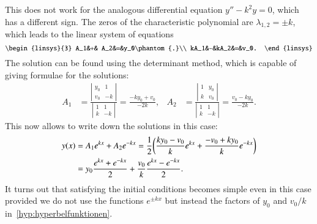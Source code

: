 This does not work for the analogous differential equation
$y''-k^2y=0$, which has a different sign.
The zeros of the characteristic polynomial are $\lambda_{1,2}=\pm k$,
which leads to the linear system of equations
\[
\begin{linsys}{3}
 A_1&+& A_2&=&y_0\phantom{.}\\
kA_1&-&kA_2&=&v_0.
\end{linsys}
\]
The solution can be found using the determinant method, which is
capable of giving formulae for the solutions:
\begin{align*}
A_1
&=
\frac{\left|\begin{matrix}y_0&1\\v_0&-k\end{matrix}\right|}{\left|\begin{matrix}1&1\\k&-k\end{matrix}\right|}
=
\frac{-ky_0+v_0}{-2k},
&
A_2
&=
\frac{\left|\begin{matrix}1&y_0\\k&v_0\end{matrix}\right|}{\left|\begin{matrix}1&1\\k&-k\end{matrix}\right|}
=\frac{v_0-ky_0}{-2k}.
\end{align*}
This now allows to write down the solutions in this case:
\begin{align}
y(x)
&=
A_1e^{kx}+A_2e^{-kx}
=
\frac12\biggl(
\frac{ky_0-v_0}k e^{kx}
+
\frac{-v_0+ky_0}k e^{-kx}
\biggr)
\notag
\\
&=
y_0\frac{e^{kx}+e^{-kx}}2
+\frac{v_0}{k}\frac{e^{kx}-e^{-kx}}2.
\label{hyp:hyperbelfunktionen}
\end{align}
It turns out that satisfying the initial conditions becomes simple
even in this case provided we do not use the functions $e^{\pm kx}$
but instead the factors of $y_0$ and $v_0/k$ in~\eqref{hyp:hyperbelfunktionen}.

